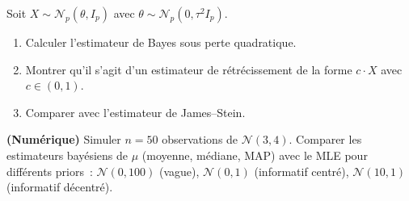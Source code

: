 \begin{exercice}
Soit $X \sim \mathcal{N}_p(\theta, I_p)$ avec $\theta \sim \mathcal{N}_p(0, \tau^2 I_p)$.
\begin{enumerate}
  \item Calculer l'estimateur de Bayes sous perte quadratique.
  \item Montrer qu'il s'agit d'un estimateur de r\'etr\'ecissement
        de la forme $c \cdot X$ avec $c \in (0,1)$.
  \item Comparer avec l'estimateur de James--Stein.
\end{enumerate}
\end{exercice}

\begin{exercice}
\textbf{(Num\'erique)} Simuler $n = 50$ observations de
$\mathcal{N}(3, 4)$. Comparer les estimateurs bay\'esiens de $\mu$
(moyenne, m\'ediane, MAP) avec le MLE pour diff\'erents priors~:
$\mathcal{N}(0, 100)$ (vague), $\mathcal{N}(0, 1)$ (informatif
centr\'e), $\mathcal{N}(10, 1)$ (informatif d\'ecentr\'e).
\end{exercice}
